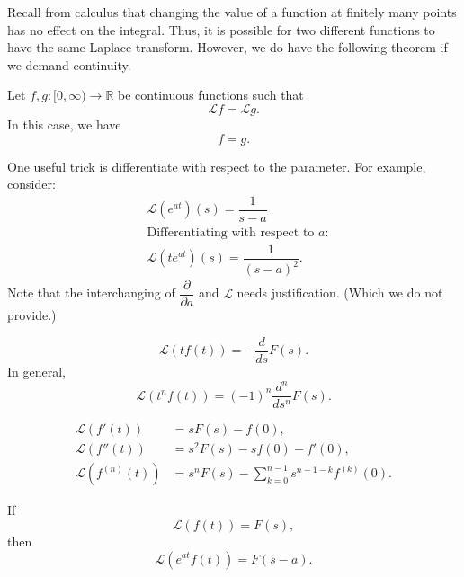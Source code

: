 Recall from calculus that changing the value of a function at finitely many points has no effect on the integral. Thus, it is possible for two different functions to have the same Laplace transform. However, we do have the following theorem if we demand continuity.
\newpage
\begin{thm} 
	Let $f, g:[0, \infty) \to \mathbb{R}$ be continuous functions such that
	\[\mathcal{L}f = \mathcal{L}g.\]
	In this case, we have
	\[f = g.\]
\end{thm}

\begin{mdframed}[style=boxstyle, frametitle={A trick}]
	One useful trick is differentiate with respect to the parameter. For example, consider:
	\begin{align*} 
		& \mathcal{L}(e^{at})(s) = \dfrac{1}{s - a}\\
		& \text{Differentiating with respect to }a:\\
		& \mathcal{L}(te^{at})(s) = \dfrac{1}{(s - a)^2}.
	\end{align*}
	Note that the interchanging of $\dfrac{\partial}{\partial a}$ and $\mathcal{L}$ needs justification. (Which we do not provide.)
\end{mdframed}

\begin{thm}
	\begin{equation*} 
		\mathcal{L}(tf(t)) = -\dfrac{d}{ds}F(s).
	\end{equation*}
	In general,
	\begin{equation*} 
		\mathcal{L}(t^nf(t)) = (-1)^n\dfrac{d^n}{ds^n}F(s).
	\end{equation*}
\end{thm}

\begin{thm}
	\begin{align*} 
		\mathcal{L}(f'(t)) &= sF(s) - f(0),\\
		\mathcal{L}(f''(t)) &= s^2F(s) - sf(0) - f'(0),\\
		\mathcal{L}(f^{(n)}(t)) &= s^nF(s) - \sum_{k=0}^{n-1} s^{n-1-k}f^{(k)}(0).
	\end{align*}
\end{thm}

\begin{thm}
	If
	\begin{equation*} 
		\mathcal{L}(f(t)) = F(s),
	\end{equation*}
	then
	\begin{equation*} 
		\mathcal{L}(e^{at}f(t)) = F(s - a).
	\end{equation*}
\end{thm}

